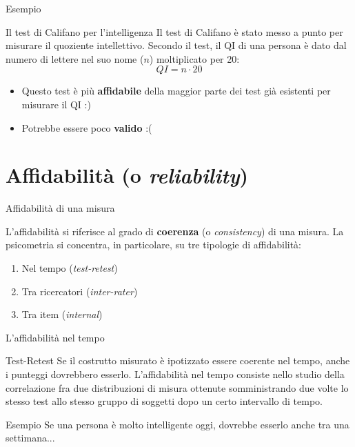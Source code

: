 \documentclass{beamer}
\begin{document}
\begin{frame}{Esempio}
\begin{block}{Il test di Califano per l'intelligenza}
    Il test di Califano è stato messo a punto per misurare il quoziente intellettivo. Secondo il test, il QI di una persona è dato dal numero di lettere nel suo nome ($n$) moltiplicato per 20: \\
    \[
    QI = n \cdot 20
    \]
\end{block}
\pause
\begin{itemize}
    \item Questo test è più \textbf{affidabile} della maggior parte dei test già esistenti per misurare il QI :)
    \pause
    \item Potrebbe essere poco \textbf{valido} :(
\end{itemize}
\end{frame}

\section{Affidabilità (o \textit{reliability})}
\begin{frame}{Affidabilità di una misura}
    \begin{block}{L'affidabilità}
        si riferisce al grado di \textbf{coerenza} (o \textit{consistency}) di una misura. La psicometria si concentra, in particolare, su tre tipologie di affidabilità:
    \end{block}
    \begin{enumerate}
        \item Nel tempo (\textit{test-retest})
        \item Tra ricercatori (\textit{inter-rater})
        \item Tra item (\textit{internal})
    \end{enumerate}
\end{frame}

\begin{frame}{L'affidabilità nel tempo}
    \begin{block}{Test-Retest}
        Se il costrutto misurato è ipotizzato essere coerente nel tempo, anche i punteggi dovrebbero esserlo. L'affidabilità nel tempo consiste nello studio della correlazione fra due distribuzioni di misura ottenute somministrando due volte lo stesso test allo stesso gruppo di soggetti dopo un certo intervallo di tempo.
    \end{block}
    \begin{block}{Esempio}
        Se una persona è molto intelligente oggi, dovrebbe esserlo anche tra una settimana...
    \end{block}
\end{frame}
\end{document}

